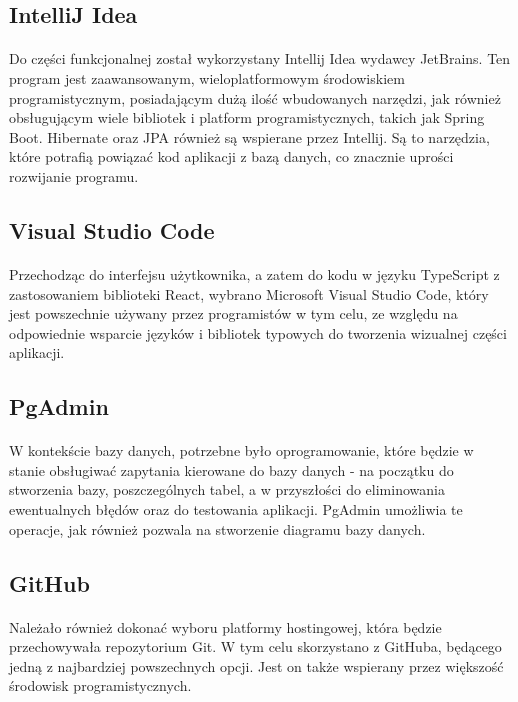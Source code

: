 \subsection{IntelliJ Idea}
\paragraph{}
Do części funkcjonalnej został wykorzystany Intellij Idea wydawcy JetBrains. Ten program jest zaawansowanym, wieloplatformowym środowiskiem programistycznym, posiadającym dużą ilość wbudowanych narzędzi, jak również obsługującym wiele bibliotek i platform programistycznych, takich jak Spring Boot. Hibernate oraz JPA również są wspierane przez Intellij. Są to narzędzia, które potrafią powiązać kod aplikacji z bazą danych, co znacznie uprości rozwijanie programu.

\subsection{Visual Studio Code}
\paragraph{}
Przechodząc do interfejsu użytkownika, a zatem do kodu w języku TypeScript z zastosowaniem biblioteki React, wybrano Microsoft Visual Studio Code, który jest powszechnie używany przez programistów w tym celu, ze względu na odpowiednie wsparcie języków i bibliotek typowych do tworzenia wizualnej części aplikacji. 

\subsection{PgAdmin}
\paragraph{}
W kontekście bazy danych, potrzebne było oprogramowanie, które będzie w stanie obsługiwać zapytania kierowane do bazy danych - na początku do stworzenia bazy, poszczególnych tabel, a w przyszłości do eliminowania ewentualnych błędów oraz do testowania aplikacji. PgAdmin umożliwia te operacje, jak również pozwala na stworzenie diagramu bazy danych.

\subsection{GitHub}
\paragraph{}
Należało również dokonać wyboru platformy hostingowej, która będzie przechowywała repozytorium Git. W tym celu skorzystano z GitHuba, będącego jedną z najbardziej powszechnych opcji. Jest on także wspierany przez większość środowisk programistycznych.

